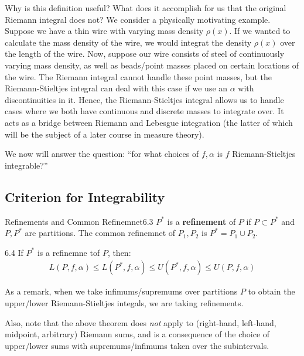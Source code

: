 \noindent Why is this definition useful? What does it accomplish for us that the original Riemann integral does not? We consider a physically motivating example. Suppose we have a thin wire with varying mass density $\rho(x)$. If we wanted to calculate the mass density of the wire, we would integrat the density $\rho(x)$ over the length of the wire. Now, suppose our wire consists of steel of continuously varying mass density, as well as beads/point masses placed on certain locations of the wire. The Riemann integral cannot handle these point masses, but the Riemann-Stieltjes integral can deal with this case if we use an $\alpha$ with discontinuities in it. Hence, the Riemann-Stieltjes integral allows us to handle cases where we both have continuous and discrete masses to integrate over. It acts as a bridge between Riemann and Lebesgue integration (the latter of which will be the subject of a later course in measure theory).

We now will answer the question: ``for what choices of $f, \alpha$ is $f$ Riemann-Stieltjes integrable?''

\subsection{Criterion for Integrability}

\begin{definition}{Refinements and Common Refinemnet}{6.3}
    $P^*$ is a \textbf{refinement} of $P$ if $P \subset P^*$ and $P, P^*$ are partitions. The common refinemnet of $P_1, P_2$ is $P^* = P_1 \cup P_2$.
\end{definition}

\begin{theorem}{}{6.4}
    If $P^*$ is a refinemne tof $P$, then:
    \begin{align*}
        L(P, f, \alpha) \leq L(P^*, f, \alpha) \leq U(P^*, f, \alpha) \leq U(P, f, \alpha)
    \end{align*}
\end{theorem}

\noindent As a remark, when we take infimums/supremums over partitions $P$ to obtain the upper/lower Riemann-Stieltjes integals, we are taking refinements.

Also, note that the above theorem does \textit{not} apply to (right-hand, left-hand, midpoint, arbitrary) Riemann sums, and is a consequence of the choice of upper/lower sums with supremums/infimums taken over the subintervals.

